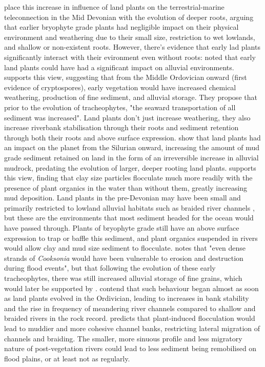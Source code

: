 \documentclass[11pt,a4paper]{article}
\begin{document}
\cite{Algeo1998} place this increase in influence of land plants on the terrestrial-marine teleconnection in the Mid Devonian with the evolution of deeper roots, arguing that earlier bryophyte grade plants had negligible impact on their physical environment and weathering due to their small size, restriction to wet lowlands, and shallow or non-existent roots.
 However, there's evidence that early lad plants significantly interact with their evironment even without roots:
\cite{Schumm1968} noted that early land plants could have had a significant impact on alluvial environments. 
\cite{Davies2010} supports this view, suggesting that from the Middle Ordovician onward (first evidence of cryptospores), early vegetation would have increased chemical weathering, production of fine sediment, and alluvial storage. They propose that prior to the evolution of tracheophytes, "the seaward transportation of all sediment was increased".
 Land plants don't just increase weathering, they also increase riverbank stabilisation through their roots \citep{McMahon2018b} and sediment retention through both their roots and above surface expression. 
\cite{McMahon2018a} show that land plants had an impact on the planet from the Silurian onward, increasing the amount of mud grade sediment retained on land in the form of an irreversible increase in alluvial mudrock, predating the evolution of larger, deeper rooting land plants. 
\cite{Zeichner2021} supports this view, finding that clay size particles flocculate much more readily with the presence of plant organics in the water than without them, greatly increasing mud deposition. 
Land plants in the pre-Devonian may have been small and primarily restricted to lowland alluvial habitats such as braided river channels \citep{Davies2010}, but these are the environments that most sediment headed for the ocean would have passed through.
 Plants of bryophyte grade still have an above surface expression to trap or baffle this sediment, and plant organics suspended in rivers would allow clay and mud size sediment to flocculate. 
\cite{Davies2010} notes that "even dense strands of \textit{Cooksonia} would have been vulnerable to erosion and destruction during flood events", but that following the evolution of these early tracheophytes, there was still increased alluvial storage of fine grains, which would later be supported by \cite{McMahon2018a}. 
  \cite{McMahon2018b} contend that such behaviour began almost as soon as land plants evolved in the Ordivician, leading to increases in bank stability and the rise in frequency of meandering river channels compared to shallow and braided rivers in the rock record. 
 \cite{Zeichner2021} predicts that plant-induced flocculation would lead to muddier and more cohesive channel banks, restricting lateral migration of channels and braiding.
 The smaller, more sinuous profile and less migratory nature of post-vegetation rivers could lead to less sediment being remobilised on flood plains, or at least not as regularly. %
\end{document}
